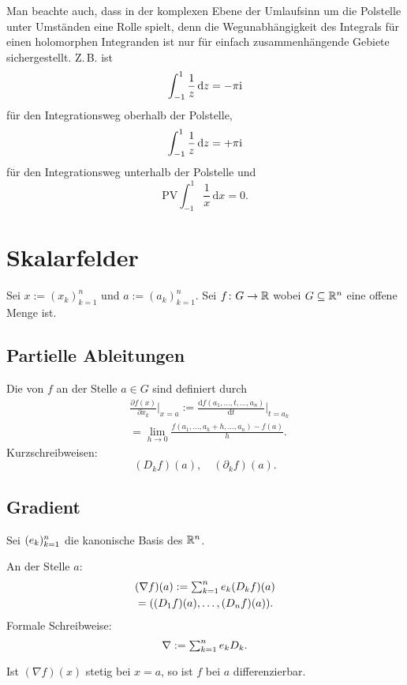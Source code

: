 Man beachte auch, dass in der komplexen Ebene der Umlaufsinn um
die Polstelle unter Umständen eine Rolle spielt, denn die
Wegunabhängigkeit des Integrals für einen holomorphen Integranden
ist nur für einfach zusammenhängende Gebiete
sichergestellt. Z.\,B. ist
\begin{equation}
\int_{-1}^1 \frac{1}{z}\,\mathrm dz = -\pi\mathrm i
\end{equation}
für den Integrationsweg oberhalb der Polstelle,
\begin{equation}
\int_{-1}^1 \frac{1}{z}\,\mathrm dz = +\pi\mathrm i
\end{equation}
für den Integrationsweg unterhalb der Polstelle und
\begin{equation}
\mathrm{PV}\int_{-1}^1 \frac{1}{x}\,\mathrm dx = 0.
\end{equation}

\section{Skalarfelder}
Sei $x:=(x_k)_{k=1}^n$ und $a:=(a_k)_{k=1}^n$. Sei $f\colon G\to\mathbb R$
wobei $G\subseteq\mathbb R^n$ eine offene Menge ist.
\subsection{Partielle Ableitungen}
\begin{definition}
Die 
von $f$ an der Stelle $a\in G$ sind definiert durch
\begin{equation}
\begin{split}
&\frac{\partial f(x)}{\partial x_k}\bigg|_{x=a}
:= \frac{\mathrm df(a_1,\ldots,t,\ldots,a_n)}{\mathrm dt}\bigg|_{t=a_k}\\
&= \lim_{h\to 0}\frac{f(a_1,\ldots,a_k+h,\ldots,a_n)-f(a)}{h}.
\end{split}
\end{equation}
Kurzschreibweisen:
\begin{equation}
(D_k f)(a),\quad (\partial_k f)(a).
\end{equation}
\end{definition}
\subsection{Gradient}
Sei $(e_k)_{k=1}^n$ die kanonische Basis des $\mathbb R^n$.
\begin{definition}[Gradient]
An der Stelle $a$:
\begin{equation}
\begin{split}
&(\nabla f)(a) := \textstyle\sum_{k=1}^n e_k (D_k f)(a)\\
&= ((D_1 f)(a),\ldots,(D_n f)(a)).
\end{split}
\end{equation}
Formale Schreibweise:
\begin{equation}
\nabla := \textstyle\sum_{k=1}^n e_k D_k.
\end{equation}
\end{definition}
\noindent
Ist $(\nabla f)(x)$ stetig bei $x=a$, so
ist $f$ bei $a$ differenzierbar.


